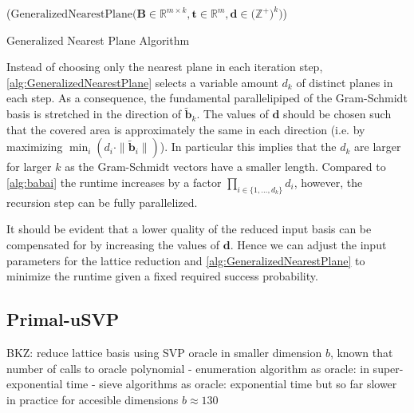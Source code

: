 \begin{algorithm2e}
  \Begin($\text{GeneralizedNearestPlane} {(} \mathbf{B} \in \mathbb{R}^{m \times k},\mathbf{t} \in \mathbb{R}^{m}, \mathbf{d} \in {(}\mathbb{Z}^+{)}^k {)}$)
    { %
  }
  \caption{Generalized Nearest Plane Algorithm \cite{LP11}}\label{alg:GeneralizedNearestPlane}
\end{algorithm2e}
Instead of choosing only the nearest plane in each iteration step, \cref{alg:GeneralizedNearestPlane} selects a variable amount $d_k$ of distinct planes in each step. As a consequence, the fundamental parallelipiped of the Gram-Schmidt basis is stretched in the direction of $\tilde{\mathbf{b}}_k$. The values of $\mathbf{d}$ should be chosen such that the covered area is approximately the same in each direction (i.e. by maximizing $\min_i(d_i \cdot \|\tilde{\mathbf{b}}_i\|)$). In particular this implies that the $d_k$ are larger for larger $k$ as the Gram-Schmidt vectors have a smaller length. %
Compared to \cref{alg:babai} the runtime increases by a factor $\prod_{i \in \{1, \dots, d_k\}} d_i$, however, the recursion step can be fully parallelized.

It should be evident that a lower quality of the reduced input basis can be compensated for by increasing the values of $\mathbf{d}$. Hence we can adjust the input parameters for the lattice reduction and \cref{alg:GeneralizedNearestPlane} to minimize the runtime given a fixed required success probability. %




\subsection{Primal-uSVP \cite{ADPS16, BG14}} %
BKZ: reduce lattice basis using SVP oracle in smaller dimension $b$, known that number of calls to oracle polynomial
- enumeration algorithm as oracle: in super-exponential time
- sieve algorithms as oracle: exponential time but so far slower in practice for accesible dimensions $b\approx 130$

